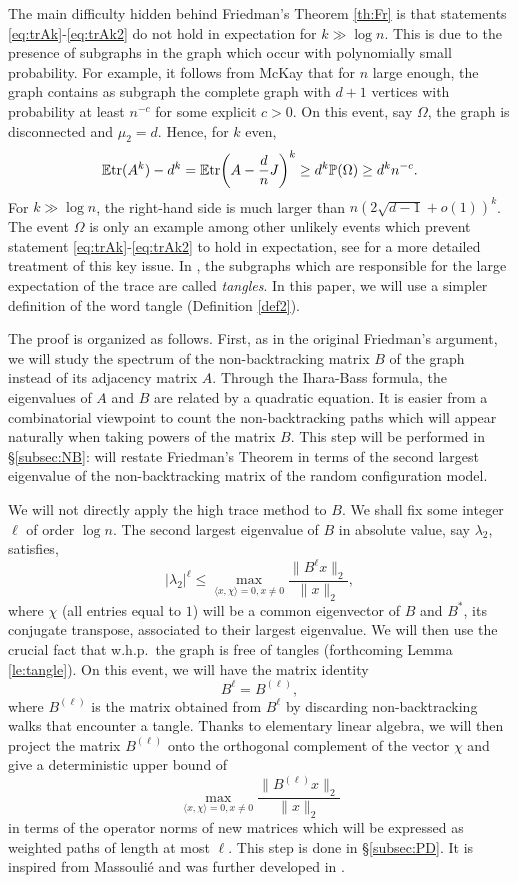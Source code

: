 \documentclass[11pt]{article}
\newcommand{\tr}{{\rm tr}}
\newcommand{\dE}{\mathbb {E}}
\newcommand{\dP}{\mathbb{P}}
\newcommand{\ABS}[1]{{{\left| #1 \right|}}} %
\newcommand{\PAR}[1]{{{\left(#1\right)}}} %
\newcommand{\1}{1\!\!{\sf I}}\newcommand{\IND}{\1}
\newcommand{\whp}{{w.h.p.~}}
\begin{document}
The main difficulty hidden behind Friedman's Theorem \ref{th:Fr} is that statements \eqref{eq:trAk}-\eqref{eq:trAk2} do not hold in expectation for $k \gg \log n$. This is due to the presence of subgraphs in the graph which occur with polynomially small probability. For example, it follows from McKay  \cite{MR681916} that for $n$ large enough, the graph contains as subgraph the complete graph with $d+1$ vertices with probability at least $n^{- c}$  for some explicit $c > 0$. On this event, say $\Omega$, the graph is disconnected and $\mu_2 = d$. Hence, for $k$ even, 
$$
\dE \tr (A^k) - d^k = \dE \tr \PAR{ A - \frac{d}{n} J  } ^k \geq d^k \dP ( \Omega) \geq d^k n^{-c}. 
$$
For $k \gg \log n$, the right-hand side is much larger than $n \PAR{ 2 \sqrt{d-1} + o(1) }^k$. The event $\Omega$ is only an example among other unlikely events which prevent statement  \eqref{eq:trAk}-\eqref{eq:trAk2} to hold in expectation, see \cite{MR2437174} for a more detailed treatment of this key issue. In \cite{MR2437174}, the subgraphs which are responsible for the large expectation of the trace are called {\em tangles}. In this paper, we will use a  simpler definition of the word tangle (Definition \ref{def2}). 



The proof is organized as follows. First, as in the original Friedman's argument, we will study the spectrum of the non-backtracking matrix $B$ of the graph instead of its adjacency matrix $A$.  Through the Ihara-Bass formula,  the eigenvalues of $A$ and $B$ are related by a quadratic equation. It is easier from a combinatorial viewpoint to count the non-backtracking paths which will appear naturally when taking powers of the matrix $B$. This step will be performed in \S \ref{subsec:NB}: will restate Friedman's Theorem in terms of the second largest eigenvalue of the non-backtracking matrix of the random configuration model. 


We will not directly apply the high trace method to $B$. We shall fix some integer $\ell$ of order $\log n$. The second largest eigenvalue of $B$ in absolute value, say $\lambda_2$, satisfies, 
$$
\ABS{\lambda_2}^\ell  \leq \max_{\langle x , \chi \rangle   = 0, x \ne 0} \frac{\| B^\ell x \|_2}{\|x\|_2}, 
$$
where $\chi$  (all entries equal to $1$) will be a common eigenvector of $B$ and $B^*$, its conjugate transpose, associated to their largest eigenvalue. 
We will then use the crucial fact that \whp the graph is free of tangles (forthcoming Lemma \ref{le:tangle}). On this event, we will have the matrix identity
$$
B^{\ell} = B^{(\ell)},
$$
where $B^{(\ell)}$ is the matrix
obtained from $B^\ell$ by discarding non-backtracking walks that encounter a
tangle.  Thanks to elementary linear algebra, we will then project the matrix $B^{(\ell)}$ onto the orthogonal complement of the vector $\chi$ and give a deterministic upper bound  of
 $$
  \max_{\langle x , \chi \rangle   = 0, x \ne 0} \frac{\| B^{(\ell)} x \|_2}{\|x\|_2}
 $$
in terms of the operator norms of new matrices which will be expressed as weighted paths of length at most $\ell$. This step is done in \S \ref{subsec:PD}. It is inspired from  Massouli\'e \cite{M13} and was further developed in \cite{BLM}.
\end{document}
